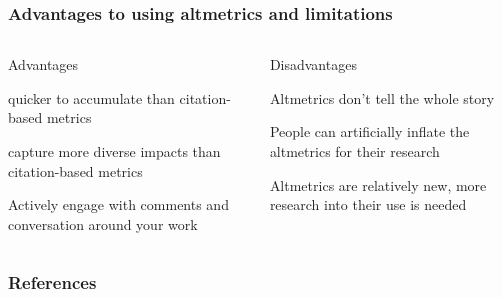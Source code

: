 \documentclass{beamer}
\begin{document}
\begin{frame}
    \frametitle{Advantages to using altmetrics and limitations}
    \begin{columns}[T]
        \begin{column}{.5\textwidth}
            \centering Advantages
            \begin{propslist}
                \item quicker to accumulate than citation-based metrics \pause
                \item capture more diverse impacts than citation-based metrics \pause
                \item Actively engage with comments and conversation around your work \pause
            \end{propslist}
        \end{column}
        \begin{column}{.5\textwidth}
            \centering Disadvantages %
            \begin{conslist}
                \item Altmetrics don’t tell the whole story \pause
                \item People can artificially inflate the altmetrics for their research \pause
                \item Altmetrics are relatively new, more research into their use is needed \pause
            \end{conslist}
        \end{column}
    \end{columns}
\end{frame}

\begin{frame}[allowframebreaks]
    \frametitle{References}

    
    

\end{frame}
\end{document}
